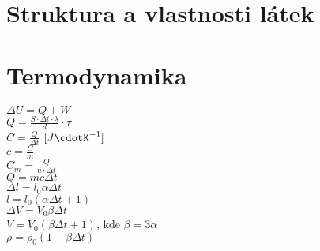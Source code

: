 \documentclass{article}
\begin{document}
\section{Struktura a vlastnosti látek}
\begin{multicols}{2}
\noindent $A_r = \frac{m_a}{u}$\\
$u = 1.66 \cdot 10^{-27} \textrm{ kg}$\\
$M_r = \frac{m_m}{u}$\\
$N_A = 6,022 \cdot 10^{23} \textrm{ mol} ^{-1}$\\
$n = \frac{N}{N_A}$ $[\textrm{mol}]$\\
$M_m = \frac{m}{n}$ $\left[\textrm{kg}\cdot \textrm{mol} ^{-1}}\right]$\\
$M_m = 10^{-3} \cdot M_r$\\
$V_m = \frac{V}{n}$ $\left[\textrm{m}^3\cdot\textrm{mol}^{-1}\right]$\\
$\rho = \frac{M_m}{V_m}$
\end{multicols}

\section{Termodynamika}
\begin{multicols}{2}
\noindent $\Delta U = Q + W$\\
$Q = \frac{S\cdot \Delta t \cdot \lambda}{d}\cdot \tau$\\
$C = \frac{Q}{\Delta t}$ $[J\cdotK^{-1}]$\\
$c = \frac{C}{m}$\\
$C_m = \frac{Q}{u\cdot \Delta t}$\\
$Q = mc\Delta t$\\
$\Delta l = l_0 \alpha \Delta t$\\
$l = l_0(\alpha\Delta t + 1)$\\
$\Delta V = V_0 \beta \Delta t$\\
$V = V_0(\beta\Delta t + 1)$, kde
$\beta = 3\alpha$ \\
$\rho = \rho _0 (1 - \beta \Delta t)$
\end{multicols}
\end{document}
